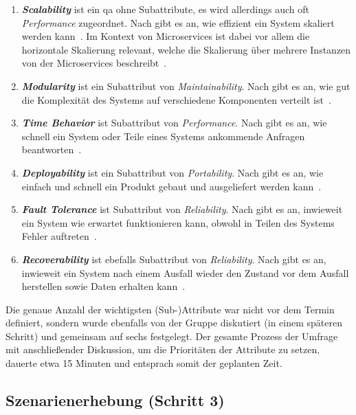 \begin{enumerate}
	\item \textbf{\emph{Scalability}} ist ein \gls{qa} ohne Subattribute, es wird allerdings auch oft \emph{Performance} zugeordnet. Nach  gibt es an, wie effizient ein System skaliert werden kann~\cite{koch-scalability-1}. Im Kontext von Microservices ist dabei vor allem die horizontale Skalierung relevant, welche die Skalierung über mehrere Instanzen von der Microservices beschreibt~\cite{koch-scalability-2}.
	\item \textbf{\emph{Modularity}} ist ein Subattribut von \emph{Maintainability}. Nach  gibt es an, wie gut die Komplexität des Systems auf verschiedene Komponenten verteilt ist~\cite{ISO-25010}.
	\item \textbf{\emph{Time Behavior}} ist Subattribut von \emph{Performance}. Nach  gibt es an, wie schnell ein System oder Teile eines Systems ankommende Anfragen beantworten~\cite{ISO-25010,koch-time-behavior-1,koch-time-behavior-2}.
	\item \textbf{\emph{Deployability}} ist ein Subattribut von \emph{Portability}. Nach  gibt es an, wie einfach und schnell ein Produkt gebaut und ausgeliefert werden kann~\cite{koch-scalability-1,koch-deployability}.
	\item \textbf{\emph{Fault Tolerance}} ist Subattribut von \emph{Reliability}. Nach  gibt es an, inwieweit ein System wie erwartet funktionieren kann, obwohl in Teilen des Systems Fehler auf\-tre\-ten~\cite{ISO-25010,koch-fault-tolerance}.
	\item \textbf{\emph{Recoverability}} ist ebefalls Subattribut von \emph{Reliability}. Nach  gibt es an, inwieweit ein System nach einem Ausfall wieder den Zustand vor dem Ausfall herstellen sowie Daten erhalten kann~\cite{ISO-25010}.
\end{enumerate}
Die genaue Anzahl der wichtigsten (Sub-)Attribute war nicht vor dem Termin definiert, sondern wurde ebenfalls von der Gruppe diskutiert (in einem späteren Schritt) und gemeinsam auf sechs festgelegt.
Der gesamte Prozess der Umfrage mit anschließender Diskussion, um die Prioritäten der Attribute zu setzen, dauerte etwa 15 Minuten und entsprach somit der geplanten Zeit.

\subsection{Szenarienerhebung (Schritt 3)}

